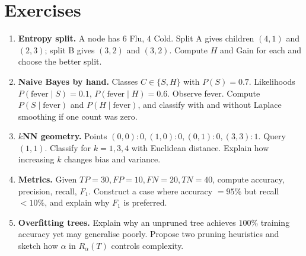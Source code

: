 \section{Exercises}
\begin{enumerate}[label=E3.\arabic*, leftmargin=*, itemsep=0.6em]
    \item \textbf{Entropy split.} A node has $6$ Flu, $4$ Cold. Split A gives children $(4,1)$ and $(2,3)$; split B gives $(3,2)$ and $(3,2)$. Compute $H$ and Gain for each and choose the better split.
    \item \textbf{Naive Bayes by hand.} Classes $C\in\{S,H\}$ with $P(S)=0.7$. Likelihoods $P(\text{fever}\mid S)=0.1$, $P(\text{fever}\mid H)=0.6$. Observe fever. Compute $P(S\mid\text{fever})$ and $P(H\mid\text{fever})$, and classify with and without Laplace smoothing if one count was zero.
    \item \textbf{$k$NN geometry.} Points $(0,0):0,(1,0):0,(0,1):0,(3,3):1$. Query $(1,1)$. Classify for $k=1,3,4$ with Euclidean distance. Explain how increasing $k$ changes bias and variance.
    \item \textbf{Metrics.} Given $TP=30,FP=10,FN=20,TN=40$, compute accuracy, precision, recall, $F_1$. Construct a case where accuracy $=95\%$ but recall $<10\%$, and explain why $F_1$ is preferred.
    \item \textbf{Overfitting trees.} Explain why an unpruned tree achieves $100\%$ training accuracy yet may generalise poorly. Propose two pruning heuristics and sketch how $\alpha$ in $R_\alpha(T)$ controls complexity.
\end{enumerate}
